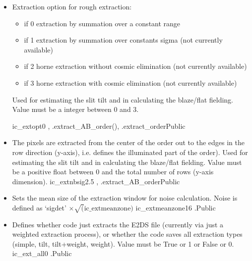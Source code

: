 \begin{itemize}

\item {}
{Extraction option for rough extraction:
\begin{itemize}
\item if 0 extraction by summation over a constant range
\item if 1 extraction by summation over constants sigma (not currently available)
\item if 2 horne extraction without cosmic elimination (not currently available)
\item if 3 horne extraction with cosmic elimination (not currently available)
\end{itemize}
 Used for estimating the slit tilt and in calculating the blaze/flat fielding. Value must be a integer between 0 and 3.
}
{ic\_extopt}{0}
{\calSLIT, \calFFraw}{\constantsfile}
{\spirouEXTOR.extract\_AB\_order(), \spirouEXTOR.extract\_order}{Public}

\item {}
{The pixels are extracted from the center of the order out to the edges in the row direction (y-axis), i.e. defines the illuminated part of the order). Used for estimating the slit tilt and in calculating the blaze/flat fielding. Value must be a positive float between 0 and the total number of rows (y-axis dimension).}
{ic\_extnbsig}{2.5}
{\calSLIT, \calFFraw}{\constantsfile}{\spirouEXTOR.extract\_AB\_order}{Public}


\item {}
{Sets the mean size of the extraction window for noise calculation. Noise is defined as `sigdet' $\times \sqrt(\text{ic\_extmeanzone})$ }
{ic\_extmeanzone}{16}
{\calextractRAW}{\constantsfile}{\calextractRAW.\progMAIN}{Public}


\item {}
{Defines whether code just extracts the E2DS file (currently via just a weighted extraction process), or whether the code saves all extraction types (simple, tilt, tilt+weight, weight). Value must be True or 1 or False or 0.}
{ic\_ext\_all}{0}
{\calextractRAW}{\constantsfile}{\calextractRAW.\progMAIN}{Public}


\end{itemize}


